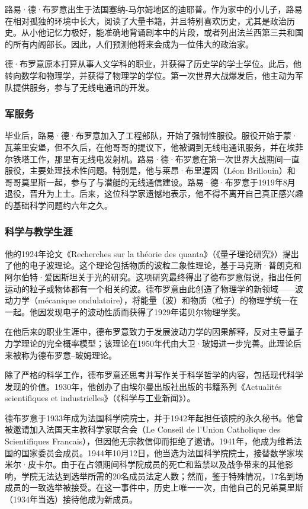 路易·德·布罗意出生于法国塞纳-马尔姆地区的迪耶普。作为家中的小儿子，路易在相对孤独的环境中长大，阅读了大量书籍，并且特别喜欢历史，尤其是政治历史。从小他记忆力极好，能准确地背诵剧本中的片段，或者列出法兰西第三共和国的所有内阁部长。因此，人们预测他将来会成为一位伟大的政治家。

德·布罗意原本打算从事人文学科的职业，并获得了历史学的学士学位。此后，他转向数学和物理学，并获得了物理学的学位。第一次世界大战爆发后，他主动为军队提供服务，参与了无线电通讯的开发。
\subsubsection{军服务}
毕业后，路易·德·布罗意加入了工程部队，开始了强制性服役。服役开始于蒙·瓦莱里安堡，但不久后，在他哥哥的提议下，他被调到无线电通讯服务，并在埃菲尔铁塔工作，那里有无线电发射机。路易·德·布罗意在第一次世界大战期间一直服役，主要处理技术性问题。特别是，他与莱昂·布里渥因（Léon Brillouin）和哥哥莫里斯一起，参与了与潜艇的无线通信建设。路易·德·布罗意于1919年8月退役，晋升为上士。后来，这位科学家遗憾地表示，他不得不离开自己真正感兴趣的基础科学问题约六年之久。
\subsubsection{科学与教学生涯}  
他的1924年论文《Recherches sur la théorie des quanta》（《量子理论研究》）提出了他的电子波理论。这个理论包括物质的波粒二象性理论，基于马克斯·普朗克和阿尔伯特·爱因斯坦关于光的研究。这项研究最终得出了德布罗意假说，指出任何运动的粒子或物体都有一个相关的波。德布罗意由此创造了物理学的新领域——波动力学（mécanique ondulatoire），将能量（波）和物质（粒子）的物理学统一在一起。他因发现电子的波动性质而获得了1929年诺贝尔物理学奖。

在他后来的职业生涯中，德布罗意致力于发展波动力学的因果解释，反对主导量子力学理论的完全概率模型；该理论在1950年代由大卫·玻姆进一步完善。此理论后来被称为德布罗意–玻姆理论。

除了严格的科学工作，德布罗意还思考并写作关于科学哲学的内容，包括现代科学发现的价值。1930年，他创办了由埃尔曼出版社出版的书籍系列《Actualités scientifiques et industrielles》（《科学与工业新闻》）。

德布罗意于1933年成为法国科学院院士，并于1942年起担任该院的永久秘书。他曾被邀请加入法国天主教科学家联合会（Le Conseil de l'Union Catholique des Scientifiques Francais），但因他无宗教信仰而拒绝了邀请。1941年，他成为维希法国的国家委员会成员。1944年10月12日，他当选为法国科学院院士，接替数学家埃米尔·皮卡尔。由于在占领期间科学院成员的死亡和监禁以及战争带来的其他影响，学院无法达到选举所需的20名成员法定人数；然而，鉴于特殊情况，17名到场成员的一致选举被接受。在这一事件中，历史上唯一一次，由他自己的兄弟莫里斯（1934年当选）接待他成为新成员。

